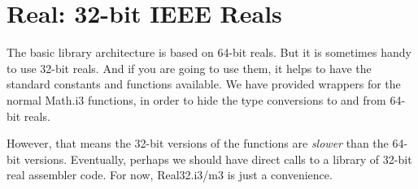 \section{Real: 32-bit IEEE Reals}

The basic library architecture is based on 64-bit reals.  But it
is sometimes handy to use 32-bit reals.  And if you are going to use
them, it helps to have the standard constants and functions
available.  We have provided wrappers for the normal Math.i3 functions,
in order to hide the type conversions to and from 64-bit reals.

However, that means the 32-bit versions of the functions
are {\em slower} than the 64-bit versions.  Eventually, perhaps
we should have direct calls to a library of 32-bit real assembler
code.  For now, Real32.i3/m3 is just a convenience.
